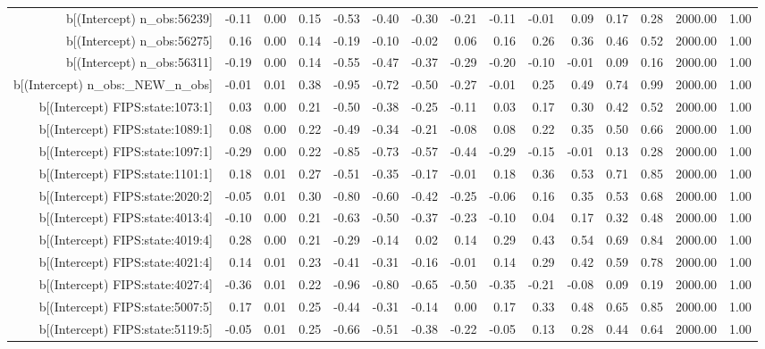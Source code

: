 \begin{table}[ht]
\begin{tabular}{rrrrrrrrrrrrrrr}
  b[(Intercept) n\_obs:56239] & -0.11 & 0.00 & 0.15 & -0.53 & -0.40 & -0.30 & -0.21 & -0.11 & -0.01 & 0.09 & 0.17 & 0.28 & 2000.00 & 1.00 \\ 
  b[(Intercept) n\_obs:56275] & 0.16 & 0.00 & 0.14 & -0.19 & -0.10 & -0.02 & 0.06 & 0.16 & 0.26 & 0.36 & 0.46 & 0.52 & 2000.00 & 1.00 \\ 
  b[(Intercept) n\_obs:56311] & -0.19 & 0.00 & 0.14 & -0.55 & -0.47 & -0.37 & -0.29 & -0.20 & -0.10 & -0.01 & 0.09 & 0.16 & 2000.00 & 1.00 \\ 
  b[(Intercept) n\_obs:\_NEW\_n\_obs] & -0.01 & 0.01 & 0.38 & -0.95 & -0.72 & -0.50 & -0.27 & -0.01 & 0.25 & 0.49 & 0.74 & 0.99 & 2000.00 & 1.00 \\ 
  b[(Intercept) FIPS:state:1073:1] & 0.03 & 0.00 & 0.21 & -0.50 & -0.38 & -0.25 & -0.11 & 0.03 & 0.17 & 0.30 & 0.42 & 0.52 & 2000.00 & 1.00 \\ 
  b[(Intercept) FIPS:state:1089:1] & 0.08 & 0.00 & 0.22 & -0.49 & -0.34 & -0.21 & -0.08 & 0.08 & 0.22 & 0.35 & 0.50 & 0.66 & 2000.00 & 1.00 \\ 
  b[(Intercept) FIPS:state:1097:1] & -0.29 & 0.00 & 0.22 & -0.85 & -0.73 & -0.57 & -0.44 & -0.29 & -0.15 & -0.01 & 0.13 & 0.28 & 2000.00 & 1.00 \\ 
  b[(Intercept) FIPS:state:1101:1] & 0.18 & 0.01 & 0.27 & -0.51 & -0.35 & -0.17 & -0.01 & 0.18 & 0.36 & 0.53 & 0.71 & 0.85 & 2000.00 & 1.00 \\ 
  b[(Intercept) FIPS:state:2020:2] & -0.05 & 0.01 & 0.30 & -0.80 & -0.60 & -0.42 & -0.25 & -0.06 & 0.16 & 0.35 & 0.53 & 0.68 & 2000.00 & 1.00 \\ 
  b[(Intercept) FIPS:state:4013:4] & -0.10 & 0.00 & 0.21 & -0.63 & -0.50 & -0.37 & -0.23 & -0.10 & 0.04 & 0.17 & 0.32 & 0.48 & 2000.00 & 1.00 \\ 
  b[(Intercept) FIPS:state:4019:4] & 0.28 & 0.00 & 0.21 & -0.29 & -0.14 & 0.02 & 0.14 & 0.29 & 0.43 & 0.54 & 0.69 & 0.84 & 2000.00 & 1.00 \\ 
  b[(Intercept) FIPS:state:4021:4] & 0.14 & 0.01 & 0.23 & -0.41 & -0.31 & -0.16 & -0.01 & 0.14 & 0.29 & 0.42 & 0.59 & 0.78 & 2000.00 & 1.00 \\ 
  b[(Intercept) FIPS:state:4027:4] & -0.36 & 0.01 & 0.22 & -0.96 & -0.80 & -0.65 & -0.50 & -0.35 & -0.21 & -0.08 & 0.09 & 0.19 & 2000.00 & 1.00 \\ 
  b[(Intercept) FIPS:state:5007:5] & 0.17 & 0.01 & 0.25 & -0.44 & -0.31 & -0.14 & 0.00 & 0.17 & 0.33 & 0.48 & 0.65 & 0.85 & 2000.00 & 1.00 \\ 
  b[(Intercept) FIPS:state:5119:5] & -0.05 & 0.01 & 0.25 & -0.66 & -0.51 & -0.38 & -0.22 & -0.05 & 0.13 & 0.28 & 0.44 & 0.64 & 2000.00 & 1.00 \\ 

\end{tabular}
\end{table}
